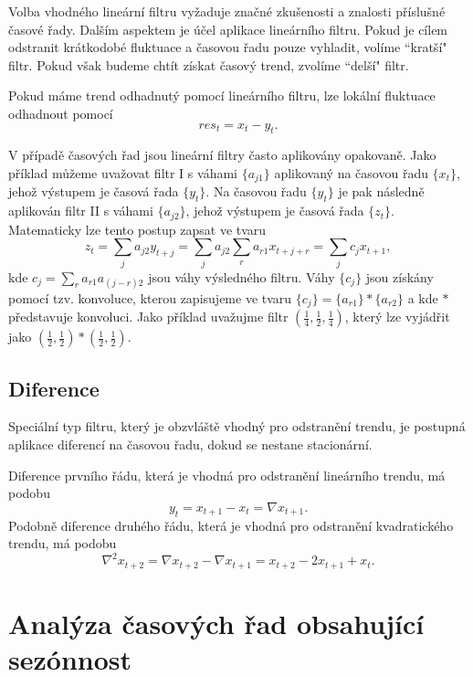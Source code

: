 Volba vhodného lineární filtru vyžaduje značné zkušenosti a znalosti příslušné časové řady. Dalším aspektem je účel aplikace lineárního filtru. Pokud je cílem odstranit krátkodobé fluktuace a časovou řadu pouze vyhladit, volíme ``kratší" filtr. Pokud však budeme chtít získat časový trend, zvolíme ``delší" filtr.

Pokud máme trend odhadnutý pomocí lineárního filtru, lze lokální fluktuace odhadnout pomocí
\begin{equation}
res_t = x_t - y_t.
\end{equation}

 V případě časových řad jsou lineární filtry často aplikovány opakovaně. Jako příklad můžeme uvažovat filtr I s váhami $\{a_{j1}\}$ aplikovaný na časovou řadu $\{x_t\}$, jehož výstupem je časová řada $\{y_t\}$. Na časovou řadu $\{y_t\}$ je pak následně aplikován filtr II s váhami $\{a_{j2}\}$, jehož výstupem je časová řada $\{z_t\}$. Matematicky lze tento postup zapsat ve tvaru
\begin{equation}
z_t = \sum_j a_{j2}y_{t + j} = \sum_j a_{j2}\sum_r a_{r1} x_{t+j+r}=\sum_j c_j x_{t + 1},
\end{equation}
kde $c_j = \sum_r a_{r1} a_{(j -r)2}$ jsou váhy výsledného filtru. Váhy $\{c_j\}$ jsou získány pomocí tzv. konvoluce, kterou zapisujeme ve tvaru $\{c_j\} = \{a_{r1}\} * \{a_{r2}\}$ a kde $*$ představuje konvoluci. Jako příklad uvažujme filtr $(\frac{1}{4}, \frac{1}{2}, \frac{1}{4})$, který lze vyjádřit jako $(\frac{1}{2}, \frac{1}{2}) * (\frac{1}{2}, \frac{1}{2})$.

\subsection{Diference}

Speciální typ filtru, který je obzvláště vhodný pro odstranění trendu, je postupná aplikace diferencí na časovou řadu, dokud se nestane stacionární.

Diference prvního řádu, která je vhodná pro odstranění lineárního trendu, má podobu
\begin{equation}
y_t = x_{t + 1} - x_t = \nabla x_{t + 1}.
\end{equation}
Podobně diference druhého řádu, která je vhodná pro odstranění kvadratického trendu, má podobu
\begin{equation}
\nabla^2 x_{t+2} = \nabla x_{t + 2} - \nabla x_{t + 1} = x_{t + 2} - 2 x_{t + 1} + x_t.
\end{equation}

\section{Analýza časových řad obsahující sezónnost}

